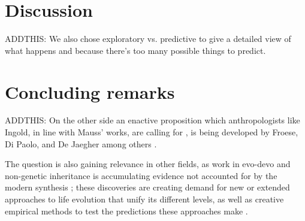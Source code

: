 \section{Discussion}





\begin{new}

ADDTHIS:
We also chose exploratory vs. predictive to give a detailed view of what happens and because there's too many possible things to predict.

\end{new}

\section{Concluding remarks}\label{sec:conclusion}


\begin{new}


ADDTHIS:
On the other side an enactive proposition which anthropologists like Ingold, in line with Mauss' works, are calling for \CN, is being developed by Froese, Di Paolo, and De Jaegher among others \CNs.

The question is also gaining relevance in other fields, as work in evo-devo and non-genetic inheritance is accumulating evidence not accounted for by the modern synthesis \CN;
these discoveries are creating demand for new or extended approaches to life evolution that unify its different levels, as well as creative empirical methods to test the predictions these approaches make \CN.

\end{new}

